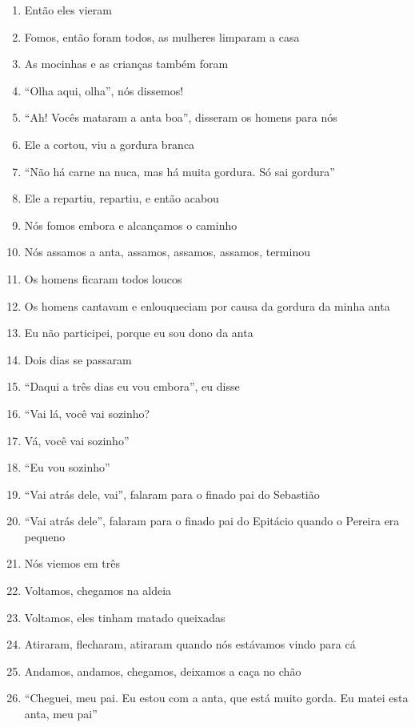 \begin{enumerate}
 \item Então eles vieram
 \item Fomos, então foram todos, as mulheres limparam a casa
 \item As mocinhas e as crianças também foram
 \item ``Olha aqui, olha'', nós dissemos!
 \item ``Ah! Vocês mataram a anta boa'', disseram os homens para nós
 \item Ele a cortou, viu a gordura branca
 \item ``Não há carne na nuca, mas há muita gordura. Só sai gordura''
 \item Ele a repartiu, repartiu, e então acabou
 \item Nós fomos embora e alcançamos o caminho
 \item Nós assamos a anta, assamos, assamos, assamos, terminou
 \item Os homens ficaram todos loucos
 \item Os homens cantavam e enlouqueciam por causa da gordura da minha anta
 \item Eu não participei, porque eu sou dono da anta
 \begin{center}\end{center}
 \item Dois dias se passaram
 \item ``Daqui a três dias eu vou embora'', eu disse
 \item ``Vai lá, você vai sozinho?
 \item Vá, você vai sozinho''
 \item ``Eu vou sozinho''
 \item ``Vai atrás dele, vai'', falaram para o finado pai do Sebastião
 \item ``Vai atrás dele'', falaram para o finado pai do Epitácio quando o
 Pereira era pequeno
 \item Nós viemos em três
 \item Voltamos, chegamos na aldeia
 \begin{center}\end{center}
 \item Voltamos, eles tinham matado queixadas
 \item Atiraram, flecharam, atiraram quando nós estávamos vindo para cá
 \item Andamos, andamos, chegamos, deixamos a caça no chão
 \item ``Cheguei, meu pai. Eu estou com a anta, que está muito gorda. Eu matei esta anta, meu pai''

\end{enumerate}
